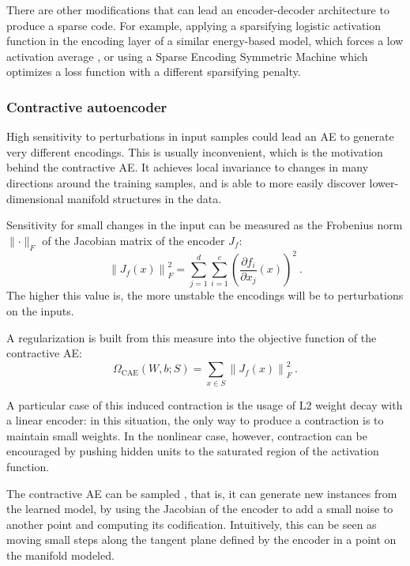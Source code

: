 There are other modifications that can lead an encoder-decoder architecture to produce a sparse code. For example, applying a sparsifying logistic activation function in the encoding layer of a similar energy-based model, which forces a low activation average , or using a Sparse Encoding Symmetric Machine  which optimizes a loss function with a different sparsifying penalty.

\subsubsection{Contractive autoencoder}

High sensitivity to perturbations in input samples could lead an AE to generate very different encodings. This is usually inconvenient, which is the motivation behind the contractive AE. It achieves local invariance to changes in many directions around the training samples, and is able to more easily discover lower-dimensional manifold structures in the data.

Sensitivity for small changes in the input can be measured as the Frobenius norm $\lVert\cdot\rVert_F$ of the Jacobian matrix of the encoder $J_f$:
\begin{equation}
  \left\lVert J_f(x) \right\rVert_F^2=
  \sum_{j=1}^d\sum_{i=1}^c \left(\frac{\partial f_i}{\partial x_j}\left(x\right)\right)^2~.
\end{equation}
The higher this value is, the more unstable the encodings will be to perturbations on the inputs.

A regularization is built from this measure into the objective function of the contractive AE:
\begin{equation}
  \Omega_{\mathrm{CAE}}(W,b;S) = \sum_{x\in S}\left\lVert J_f(x) \right\rVert_F^2~.
\end{equation}

A particular case of this induced contraction is the usage of L2 weight decay with a linear encoder: in this situation, the only way to produce a contraction is to maintain small weights. In the nonlinear case, however, contraction can be encouraged by pushing hidden units to the saturated region of the activation function.

The contractive AE can be sampled , that is, it can generate new instances from the learned model, by using the Jacobian of the encoder to add a small noise to another point and computing its codification. Intuitively, this can be seen as moving small steps along the tangent plane defined by the encoder in a point on the manifold modeled.


